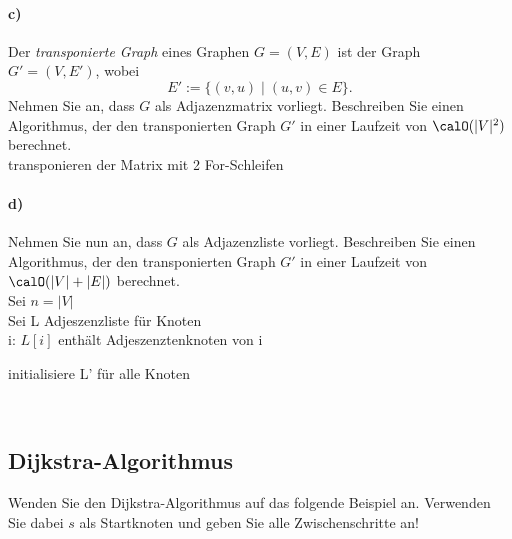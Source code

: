 \documentclass[paper=a4, fontsize=11pt]{scrartcl}
\numberwithin{equation}{section}
\numberwithin{figure}{section}
\numberwithin{table}{section}
\begin{document}
\paragraph{c)}
Der \emph{transponierte Graph} eines Graphen $G=(V,E)$ ist der Graph $G'=(V,E')$, wobei
\[ E' := \{ (v,u) \mid (u,v)\in E\}. \]
Nehmen Sie an, dass $G$ als Adjazenzmatrix vorliegt. Beschreiben Sie einen Algorithmus,
der den transponierten Graph $G'$ in einer Laufzeit von $\calO(|V|^2)$ berechnet. \\

transponieren der Matrix mit 2 For-Schleifen \\

\paragraph{d)}
Nehmen Sie nun an, dass $G$ als Adjazenzliste vorliegt. Beschreiben Sie einen Algorithmus,
der den transponierten Graph $G'$ in einer Laufzeit von $\calO(|V| + |E|)$ berechnet. \\

Sei $n= |V|$ \\
Sei L Adjeszenzliste für Knoten \\
i: $L[i]$ enthält Adjeszenztenknoten von i \\

\begin{algorithm}[H]
\SetAlgoLined
initialisiere L' für alle Knoten \\
\end{algorithm} \\

\subsection{Dijkstra-Algorithmus}
Wenden Sie den Dijkstra-Algorithmus auf das folgende Beispiel an.
Verwenden Sie dabei $s$ als Startknoten und
geben Sie alle Zwischenschritte an!
\end{document}
